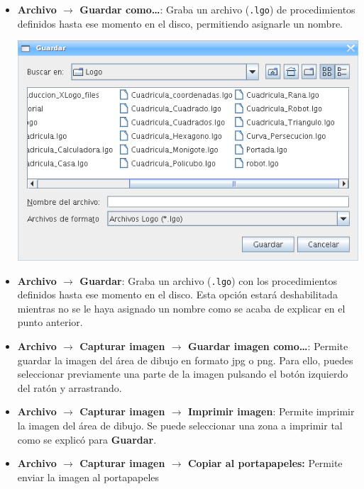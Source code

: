 \begin{itemize}
\begin{center}
      \end{center}
   \item \textbf{Archivo $\rightarrow$ Guardar como\ldots{}}:
      Graba un archivo (\texttt{.lgo}) de procedimientos definidos hasta ese
      momento en el disco, permitiendo asignarle un nombre. 
      \begin{center}
         \includegraphics[scale=0.3]{Imagenes/03_Opciones-Menu/MenuGuardar.png}
      \end{center}
   \item \textbf{Archivo $\rightarrow$ Guardar}: Graba un archivo
      (\texttt{.lgo}) con los procedimientos definidos hasta ese momento
      en el disco. Esta opci\'on estar\'a deshabilitada mientras no se le haya
      asignado un nombre como se acaba de explicar en el punto anterior.
   \item \textbf{Archivo $\rightarrow$ Capturar imagen $\rightarrow$ Guardar imagen
      como\ldots{}}: Permite guardar la imagen del
      \'area de dibujo en formato jpg o png.
      Para ello, puedes seleccionar previamente una parte
      de la imagen pulsando el bot\'on izquierdo del rat\'on y arrastrando. 
   \item \textbf{Archivo $\rightarrow$ Capturar imagen $\rightarrow$ Imprimir
      imagen}: Permite imprimir la imagen del \'area de
      dibujo. Se puede seleccionar una zona a imprimir tal como se
      explic\'o para \textbf{Guardar}.
   \item \textbf{Archivo $\rightarrow$ Capturar imagen $\rightarrow$ Copiar al
      portapapeles:}  Permite enviar la imagen al portapapeles

\end{itemize}
